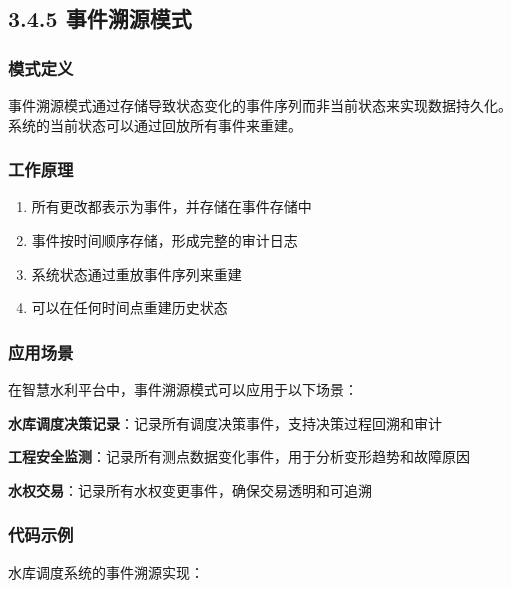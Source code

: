 \subsection{3.4.5
事件溯源模式}\label{ux4e8bux4ef6ux6eafux6e90ux6a21ux5f0f}

\subsubsection{模式定义}\label{ux6a21ux5f0fux5b9aux4e49-4}

事件溯源模式通过存储导致状态变化的事件序列而非当前状态来实现数据持久化。系统的当前状态可以通过回放所有事件来重建。

\subsubsection{工作原理}\label{ux5de5ux4f5cux539fux7406-4}

\begin{enumerate}
\def\labelenumi{\arabic{enumi}.}
\tightlist
\item
  所有更改都表示为事件，并存储在事件存储中
\item
  事件按时间顺序存储，形成完整的审计日志
\item
  系统状态通过重放事件序列来重建
\item
  可以在任何时间点重建历史状态
\end{enumerate}

\subsubsection{应用场景}\label{ux5e94ux7528ux573aux666f-4}

在智慧水利平台中，事件溯源模式可以应用于以下场景：

\textbf{水库调度决策记录}：记录所有调度决策事件，支持决策过程回溯和审计

\textbf{工程安全监测}：记录所有测点数据变化事件，用于分析变形趋势和故障原因

\textbf{水权交易}：记录所有水权变更事件，确保交易透明和可追溯

\subsubsection{代码示例}\label{ux4ee3ux7801ux793aux4f8b-4}

水库调度系统的事件溯源实现：

